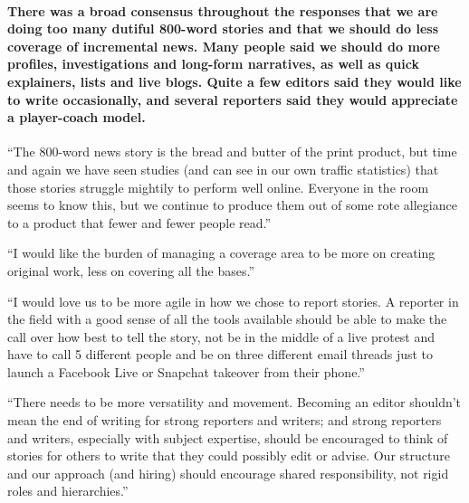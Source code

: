 \hypertarget{there-was-a-broad-consensus-throughout-the-responses-that-we-are-doing-too-many-dutiful-800-word-stories-and-that-we-should-do-less-coverage-of-incremental-news-many-people-said-we-should-do-more-profiles-investigations-and-long-form-narratives-as-well-as-quick-explainers-lists-and-live-blogs-quite-a-few-editors-said-they-would-like-to-write-occasionally-and-several-reporters-said-they-would-appreciate-a-player-coach-model}{%
\paragraph{There was a broad consensus throughout the responses that we
are doing too many dutiful 800-word stories and that we should do less
coverage of incremental news. Many people said we should do more
profiles, investigations and long-form narratives, as well as quick
explainers, lists and live blogs. Quite a few editors said they would
like to write occasionally, and several reporters said they would
appreciate a player-coach
model.}\label{there-was-a-broad-consensus-throughout-the-responses-that-we-are-doing-too-many-dutiful-800-word-stories-and-that-we-should-do-less-coverage-of-incremental-news-many-people-said-we-should-do-more-profiles-investigations-and-long-form-narratives-as-well-as-quick-explainers-lists-and-live-blogs-quite-a-few-editors-said-they-would-like-to-write-occasionally-and-several-reporters-said-they-would-appreciate-a-player-coach-model}}

``The 800-word news story is the bread and butter of the print product,
but time and again we have seen studies (and can see in our own traffic
statistics) that those stories struggle mightily to perform well online.
Everyone in the room seems to know this, but we continue to produce them
out of some rote allegiance to a product that fewer and fewer people
read.''

``I would like the burden of managing a coverage area to be more on
creating original work, less on covering all the bases.''

``I would love us to be more agile in how we chose to report stories. A
reporter in the field with a good sense of all the tools available
should be able to make the call over how best to tell the story, not be
in the middle of a live protest and have to call 5 different people and
be on three different email threads just to launch a Facebook Live or
Snapchat takeover from their phone.''

``There needs to be more versatility and movement. Becoming an editor
shouldn't mean the end of writing for strong reporters and writers; and
strong reporters and writers, especially with subject expertise, should
be encouraged to think of stories for others to write that they could
possibly edit or advise. Our structure and our approach (and hiring)
should encourage shared responsibility, not rigid roles and
hierarchies.''

